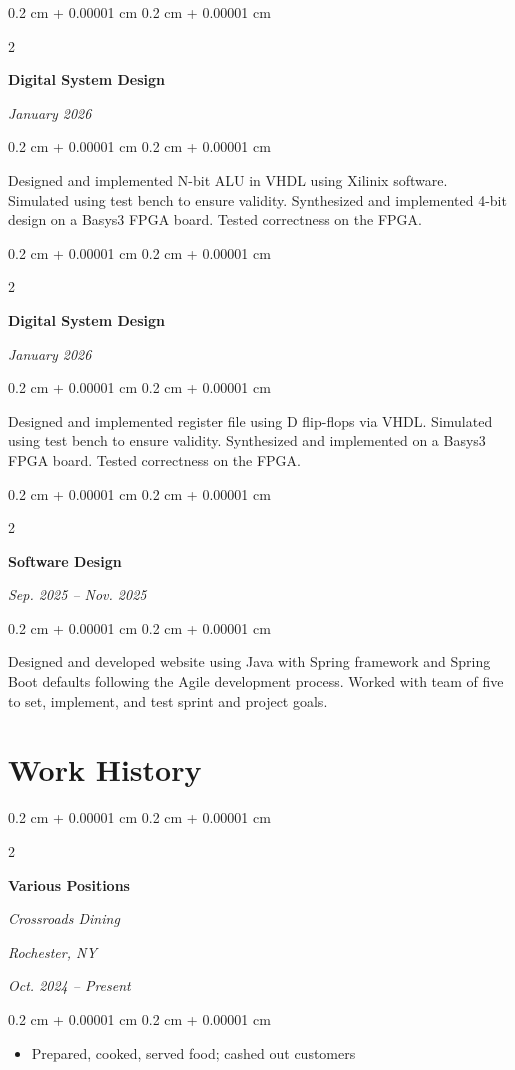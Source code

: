 \documentclass[10pt, letterpaper]{article}
\newenvironment{highlights}{
    \begin{itemize}[
        topsep=0.10 cm,
        parsep=0.10 cm,
        partopsep=0pt,
        itemsep=0pt,
        leftmargin=0.4 cm + 10pt
    ]
}{
    \end{itemize}
} %
\newenvironment{onecolentry}{
    \begin{adjustwidth}{
        0.2 cm + 0.00001 cm
    }{
        0.2 cm + 0.00001 cm
    }
}{
    \end{adjustwidth}
} %
\newenvironment{twocolentry}[2][]{
    \onecolentry
    \def\secondColumn{#2}
    \setcolumnwidth{\fill, 4.5 cm}
    \begin{paracol}{2}
}{
    \switchcolumn \raggedleft \secondColumn
    \end{paracol}
    \endonecolentry
} %
\begin{document}
\vspace{0.10 cm}
\begin{twocolentry}{ \textit{January 2026} }
	\textbf{Digital System Design}
\end{twocolentry}
\begin{onecolentry}
	Designed and implemented N-bit ALU in VHDL using Xilinix software.
	Simulated using test bench to ensure validity. Synthesized and implemented
	4-bit design on a Basys3 FPGA board. Tested correctness on the FPGA.
\end{onecolentry}

\vspace{0.10 cm}
\begin{twocolentry}{ \textit{January 2026} }
	\textbf{Digital System Design}
\end{twocolentry}
\begin{onecolentry}
	Designed and implemented register file using D flip-flops via VHDL.
	Simulated using test bench to ensure validity. Synthesized and implemented
	on a Basys3 FPGA board. Tested correctness on the FPGA.
\end{onecolentry}

\vspace{0.10 cm}
\begin{twocolentry}{ \textit{Sep. 2025 -- Nov. 2025} }
	\textbf{Software Design}
\end{twocolentry}
\begin{onecolentry}
	Designed and developed website using Java with Spring framework and
	Spring Boot defaults following the Agile development process. Worked with
	team of five to set, implement, and test sprint and project goals.
\end{onecolentry}


\section{Work History}

\begin{twocolentry}{
		\textit{Rochester, NY}

		\textit{Oct. 2024 – Present}}
	\textbf{Various Positions}

	\textit{Crossroads Dining}
\end{twocolentry}

\vspace{0.10 cm}
\begin{onecolentry}
	\begin{highlights}
		\item Prepared, cooked, served food; cashed out customers
	\end{highlights}
\end{onecolentry}
\end{document}
